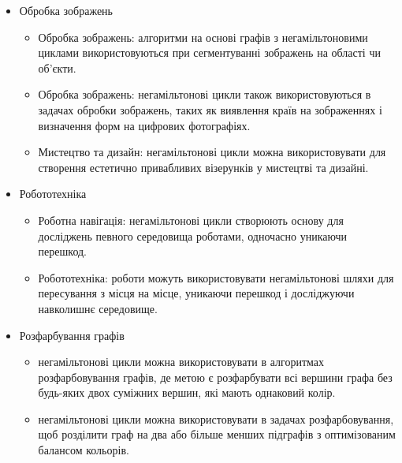 \documentclass[14pt]{article}
\begin{document}
\begin{spacing}{1.175}
\begin{itemize}
\begin{itemize}
        \end{itemize}

            
        \item Обробка зображень
        \begin{itemize}
    
            \item Обробка зображень: алгоритми на основі графів з негамільтоновими циклами використовуються при сегментуванні зображень на області чи об’єкти.
            
            \item Обробка зображень: негамільтонові цикли також використовуються в задачах обробки зображень, таких як виявлення країв на зображеннях і визначення форм на цифрових фотографіях.

            \item Мистецтво та дизайн: негамільтонові цикли можна використовувати для створення естетично привабливих візерунків у мистецтві та дизайні.
        
        \end{itemize}
        
        \item Робототехніка
        
        \begin{itemize}
            \item Роботна навігація: негамільтонові цикли створюють основу для досліджень певного середовища роботами, одночасно уникаючи перешкод.

            \item Робототехніка: роботи можуть використовувати негамільтонові шляхи для пересування з місця на місце, уникаючи перешкод і досліджуючи навколишнє середовище.
        
        \end{itemize}


        \item Розфарбування графів
        \begin{itemize}
            
            \item негамільтонові цикли можна використовувати в алгоритмах розфарбовування графів, де метою є розфарбувати всі вершини графа без будь-яких двох суміжних вершин, які мають однаковий колір.

             \item негамільтонові цикли можна використовувати в задачах розфарбовування, щоб розділити граф на два або більше менших підграфів з оптимізованим балансом кольорів.
        

\end{itemize}
\end{itemize}
\end{spacing}
\end{document}
